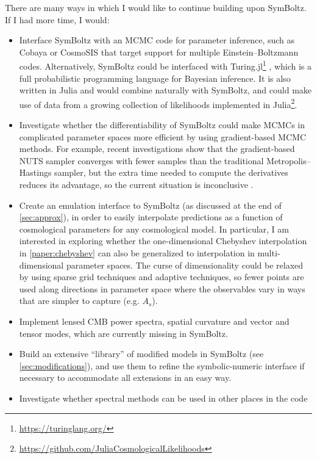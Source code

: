 \documentclass[USenglish, thumbmarks]{uiophdthesis} %
\newcommand\EB{Einstein--Boltzmann}
\begin{document}
There are many ways in which I would like to continue building upon SymBoltz.
If I had more time, I would:
\begin{itemize}
\item
Interface SymBoltz with an MCMC code for parameter inference,
such as Cobaya \cite{torradoCobayaCodeBayesian2021} or CosmoSIS \cite{zuntzCosmoSISModularCosmological2015}
that target support for multiple \EB{} codes.
Alternatively, SymBoltz could be interfaced with Turing.jl\footnote{\url{https://turinglang.org/}} \cite{fjeldeTuringjlGeneralPurposeProbabilistic2025a},
which is a full probabilistic programming language for Bayesian inference.
It is also written in Julia and would combine naturally with SymBoltz,
and could make use of data from a growing collection of likelihoods implemented in Julia\footnote{\url{https://github.com/JuliaCosmologicalLikelihoods}}.
\item
Investigate whether the differentiability of SymBoltz
could make MCMCs in complicated parameter spaces more efficient
by using gradient-based MCMC methods.
For example, recent investigations show that the gradient-based NUTS sampler converges with fewer samples than the traditional Metropolis--Hastings sampler,
but the extra time needed to compute the derivatives reduces its advantage,
so the current situation is inconclusive \cite[e.g.][]{nygaardPosteriorSamplingAge2026}.
\item
Create an emulation interface to SymBoltz (as discussed at the end of \cref{sec:approx}),
in order to easily interpolate predictions as a function of cosmological parameters for any cosmological model.
In particular, I am interested in exploring whether the one-dimensional Chebyshev interpolation in \cref{paper:chebyshev}
can also be generalized to interpolation in multi-dimensional parameter spaces.
The curse of dimensionality could be relaxed by using sparse grid techniques and adaptive techniques,
so fewer points are used along directions in parameter space where the observables vary in ways that are simpler to capture (e.g. $A_s$).
\item
Implement lensed CMB power spectra, spatial curvature and vector and tensor modes,
which are currently missing in SymBoltz.
\item
Build an extensive \enquote{library} of modified models in SymBoltz (see \cref{sec:modifications}),
and use them to refine the symbolic-numeric interface if necessary to accommodate all extensions in an easy way.
\item
Investigate whether spectral methods can be used in other places in the code

\end{itemize}
\end{document}
